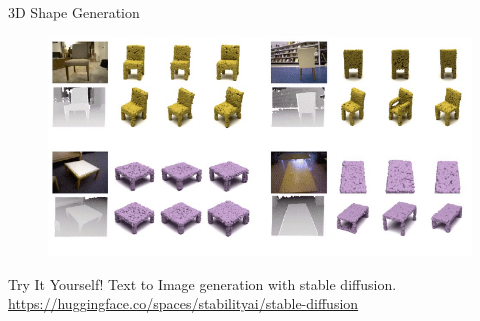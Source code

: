 \begin{frame}{3D Shape Generation}

\begin{figure}
    \centering
    \includegraphics[height=0.8\textheight, width=\textwidth, keepaspectratio]{images/diffusion/diff_results_12.png}
\end{figure}

\end{frame}

\begin{frame}{Try It Yourself!}
\centering
Text to Image generation with stable diffusion.
\centering
\href{https://huggingface.co/spaces/stabilityai/stable-diffusion}{https://huggingface.co/spaces/stabilityai/stable-diffusion}

\end{frame}